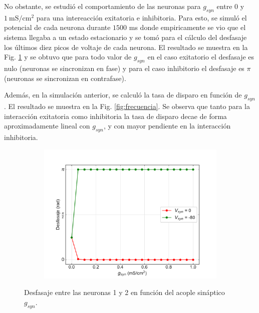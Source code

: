 \documentclass[11pt,twocolumn,twoside]{opticajnl}
\begin{document}
No obstante, se estudió el comportamiento de las neuronas para $g_{syn}$ entre $0$ y $1 ~ \text{mS}/\text{cm}^2$ para una intereacción exitatoria e inhibitoria. Para esto, se simuló el potencial de cada neurona durante $1500$ ms donde empiricamente se vio que el sistema llegaba a un estado estacionario y se tomó para el cálculo del desfasaje los últimos diez picos de voltaje de cada neurona. El resultado se muestra en la Fig. \ref{fig:desfasaje} y se obtuvo que para todo valor de $g_{syn}$ en el caso exitatorio el desfasaje es nulo (neuronas se sincronizan en fase) y para el caso inhibitorio el desfasaje es $\pi$ (neuronas se sincronizan en contrafase).

Además, en la simulación anterior, se calculó la tasa de disparo en función de $g_{syn}$. El resultado se muestra en la Fig. \ref{fig:frecuencia}. Se observa que tanto para la interacción exitatoria como inhibitoria la tasa de disparo decae de forma aproximadamente lineal con $g_{syn}$, y con mayor pendiente en la interacción inhibitoria.

\begin{figure}[ht]
    \centering
         \begin{subfigure}[b]{\linewidth}
            \includegraphics[width=\textwidth]{Figuras/desfasaje_vs_gsyn.pdf}
         \end{subfigure}
    \caption{Desfasaje entre las neuronas 1 y 2 en función del acople sináptico $g_{syn}$.} 
    \label{fig:desfasaje}
\end{figure}
\end{document}
